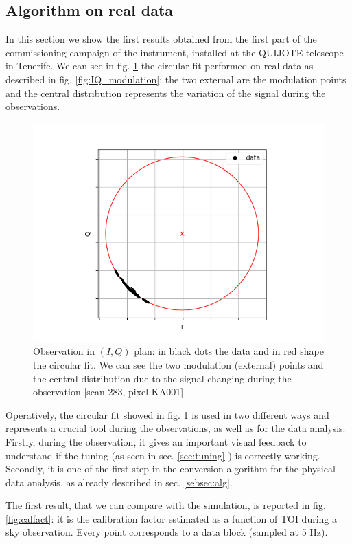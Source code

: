 \label{sec:results}

\subsection{Algorithm on real data}

In this section we show the first results obtained from the first part of the commissioning campaign of the instrument, installed at the QUIJOTE telescope in Tenerife. We can see in fig. \ref{fig:circle} the circular fit performed on real data as described in fig. \ref{fig:IQ_modulation}: the two external are the modulation points and the central distribution represents the variation of the signal during the observations.


\begin{figure}[htf]
	\centering
	\includegraphics[width=.5\textwidth]{4.results/circular_fit.png}
	\caption{Observation in $(I,Q)$ plan: in black dots the data and in red shape the circular fit. We can see the two modulation (external) points and the central distribution due to the signal changing during the observation [scan 283, pixel KA001]}
	\label{fig:circle}
\end{figure}

\noindent Operatively, the circular fit showed in fig. \ref{fig:circle} is used in two different ways and represents a crucial tool during the observations, as well as for the data analysis. Firstly, during the observation, it gives an important visual feedback to understand if the tuning (as seen in sec. \ref{sec:tuning} ) is correctly working. Secondly, it is one of the first step in the conversion algorithm for the physical data analysis, as already described in sec. \ref{sebsec:alg}.

The first result, that we can compare with the simulation, is reported in fig. \ref{fig:calfact}: it is the calibration factor estimated as a function of TOI during a sky observation. Every point corresponds to a data block (sampled at 5 Hz).

